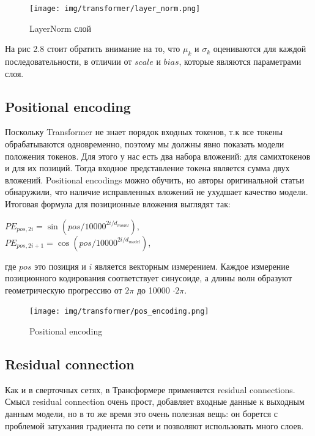 \documentclass[PMI,VKR]{HSEUniversity}
\begin{document}
\begin{figure}[h]
    \centering
    \texttt{[image: img/transformer/layer\_norm.png]}
    \caption{LayerNorm слой}
\end{figure}

На рис 2.8 стоит обратить внимание на то, что $\mu_{k}$ и $\sigma_{k}$ оцениваются для каждой последовательности, в отличии от $scale$ и $bias$, которые являются параметрами слоя.


\subsection{Positional encoding}

Поскольку Transformer не знает порядок входных токенов, т.к все токены обрабатываются одновременно, поэтому мы должны явно показать модели положения токенов. Для этого у нас есть два набора вложений: для самихтокенов и для их позиций. Тогда входное представление токена является сумма двух вложений.
Positional encodings можно обучить, но авторы оригинальной статьи обнаружили, что наличие исправленных вложений не ухудшает качество модели. Итоговая формула для позиционные вложения выглядят так:
\begin{center}
    $PE_{pos,2i} = \sin(pos/10000^{2i/d_{model}})$, \\
    $PE_{pos,2i+1} = \cos(pos/10000^{2i/d_{model}})$, \\
\end{center}

где $pos$ это позиция и $i$ является векторным измерением. Каждое измерение позиционного кодирования соответствует синусоиде, а длины волн образуют геометрическую прогрессию от $2\pi$ до 10000 $\cdot 2\pi$.

\begin{figure}[h]
    \centering
    \texttt{[image: img/transformer/pos\_encoding.png]}
    \caption{Positional encoding}
\end{figure}


\subsection{Residual connection}

Как и в сверточных сетях, в Трансформере применяется residual connections. Смысл residual connection очень прост, добавляет входные данные к выходным данным модели, но в то же время это очень полезная вещь: он борется с проблемой затухания градиента по сети и позволяют использовать много слоев.
\end{document}
